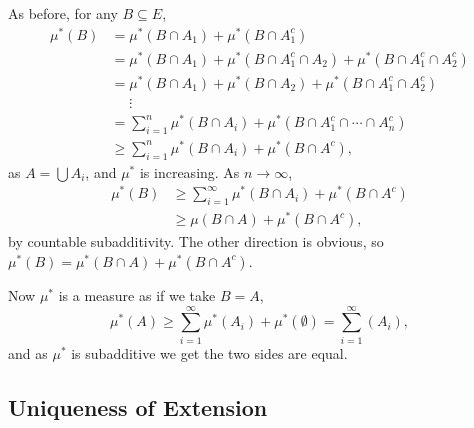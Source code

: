 \documentclass[12pt]{article}
\begin{document}
\begin{proofbox}
	As before, for any $B \subseteq E$,
	\begin{align*}
		\mu^{\ast}(B) &= \mu^{\ast}(B \cap A_1) + \mu^{\ast}(B \cap A_1^{c}) \\
			      &= \mu^{\ast}(B \cap A_1) + \mu^{\ast}(B \cap A_1^{c} \cap A_2) + \mu^{\ast}(B \cap A_1^{c} \cap A_2^{c}) \\
			      &= \mu^{\ast}(B \cap A_1) + \mu^{\ast}(B \cap A_2) + \mu^{\ast}(B \cap A_1^{c} \cap A_2^{c}) \\
			      &\quad \,\,\vdots \\
			      &= \sum_{i=1}^{n} \mu^{\ast}(B \cap A_i) + \mu^{\ast}(B \cap A_1^{c} \cap \cdots \cap A_n^{c}) \\
			      &\geq \sum_{i = 1}^{n} \mu^{\ast}(B \cap A_i) + \mu^{\ast}(B \cap A^{c}),
	\end{align*}
	as $A = \bigcup A_i$, and $\mu^{\ast}$ is increasing. As $n \to \infty$,
	\begin{align*}
		\mu^{\ast}(B) &\geq \sum_{i = 1}^{\infty} \mu^{\ast}(B \cap A_i) + \mu^{\ast}(B \cap A^{c}) \\
			      &\geq \mu(B \cap A) + \mu^{\ast}(B \cap A^{c}),
	\end{align*}
	by countable subadditivity. The other direction is obvious, so $\mu^{\ast}(B) = \mu^{\ast}(B \cap A) + \mu^{\ast}(B \cap A^{c})$.

	Now $\mu^{\ast}$ is a measure as if we take $B = A$,
	\[
	\mu^{\ast}(A) \geq \sum_{i=1}^{\infty}\mu^{\ast}(A_i) + \mu^{\ast}(\emptyset) = \sum_{i=1}^{\infty} (A_i),
	\]
	and as $\mu^{\ast}$ is subadditive we get the two sides are equal.
\end{proofbox}


\subsection{Uniqueness of Extension}
\label{sub:unique}
\end{document}
